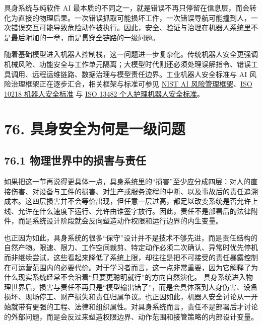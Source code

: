 

具身系统与纯软件 AI 最本质的不同之一，就是错误不再只停留在信息层，而会转化为直接的物理后果。一次错误抓取可能损坏工件，一次错误导航可能撞到人，一次错误交互可能导致危险动作被执行。因此，安全、验证与治理在机器人系统里不是最后附加的一章，而是贯穿全链路的一级问题。

随着基础模型进入机器人控制栈，这一问题进一步复杂化。传统机器人安全更强调机械风险、功能安全与工作单元隔离；大模型时代则还必须处理误解指令、错误工具调用、远程运维链路、数据治理与模型责任边界。工业机器人安全标准与 AI 风险治理框架正在逐步汇合，相关框架与标准可参见 \href{https://www.nist.gov/itl/ai-risk-management-framework}{NIST AI 风险管理框架}、\href{https://www.iso.org/standard/59820.html}{ISO 10218 机器人安全标准} 与 \href{https://www.iso.org/standard/53820.html}{ISO 13482 个人护理机器人安全标准}。

\section*{76. 具身安全为何是一级问题}

\subsection*{76.1 物理世界中的损害与责任}


如果把这一节再说得更具体一点，具身系统里的“损害”至少应分成四层：对人的直接伤害、对设备与工件的损害、对生产或服务流程的中断、以及事故后的责任追溯成本。这四层损害并不会等价出现，但任意一层过高，都足以改变系统是否允许上线、允许在什么速度下运行、允许由谁签字放行。因此，责任不是部署后的法律附件，而是系统设计阶段就会反向塑造动作权限和运行边界的内生变量。

也正因为如此，具身系统的很多“保守”设计并不是技术不够先进，而是责任结构的自然产物。限速、限力、工作空间裁剪、特定动作必须二次确认、异常时优先停机而非继续尝试，这些看起来降低了系统上限，却往往是把不可接受的责任暴露控制在可运营范围内的必要代价。对于学习者而言，这一点非常重要，因为它解释了为什么现实系统经常不会沿着“只要更聪明就行”的方向自然演化。 具身系统进入物理世界后，损害与责任不再只是“模型输出错了”，而是会具体落到人身伤害、设备损坏、现场停工、财产损失和责任归属争议。也正因如此，机器人安全讨论从一开始就带有更强的工程、法律和组织属性。对具身系统而言，责任不是部署后才讨论的外部问题，而是会反过来塑造权限边界、动作范围和接管策略的内部设计变量。

